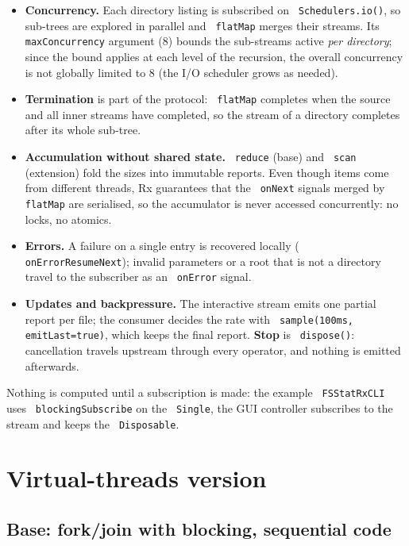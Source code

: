 \documentclass[11pt,a4paper]{article}
\newcommand{\code}[1]{\texttt{\hyphenchar\font=-1 #1}}
\begin{document}
\begin{itemize}
  \item \textbf{Concurrency.} Each directory listing is subscribed on \code{Schedulers.io()}, so
        sub-trees are explored in parallel and \code{flatMap} merges their streams. Its
        \code{maxConcurrency} argument (8) bounds the sub-streams active \emph{per directory}; since
        the bound applies at each level of the recursion, the overall concurrency is not globally
        limited to 8 (the I/O scheduler grows as needed).
  \item \textbf{Termination} is part of the protocol: \code{flatMap} completes when the source and all
        inner streams have completed, so the stream of a directory completes after its whole sub-tree.
  \item \textbf{Accumulation without shared state.} \code{reduce} (base) and \code{scan} (extension)
        fold the sizes into immutable reports. Even though items come from different threads, Rx
        guarantees that the \code{onNext} signals merged by \code{flatMap} are serialised, so the
        accumulator is never accessed concurrently: no locks, no atomics.
  \item \textbf{Errors.} A failure on a single entry is recovered locally
        (\code{onErrorResumeNext}); invalid parameters or a root that is not a directory travel to
        the subscriber as an \code{onError} signal.
  \item \textbf{Updates and backpressure.} The interactive stream emits one partial report per file;
        the consumer decides the rate with \code{sample(100ms, emitLast=true)}, which keeps the final
        report. \textbf{Stop} is \code{dispose()}: cancellation travels upstream through every
        operator, and nothing is emitted afterwards.
\end{itemize}

Nothing is computed until a subscription is made: the example \code{FSStatRxCLI} uses
\code{blockingSubscribe} on the \code{Single}, the GUI controller subscribes to the stream and keeps
the \code{Disposable}.

\section{Virtual-threads version}

\subsection{Base: fork/join with blocking, sequential code}
\end{document}
